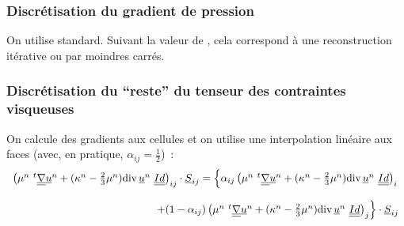 \subsubsection*{Discrétisation du gradient de pression}

On utilise  standard. Suivant la valeur de ,
cela correspond à une reconstruction itérative ou par moindres carrés.

\subsubsection*{Discrétisation du ``reste'' du tenseur des contraintes visqueuses}

On calcule des gradients aux cellules et on utilise une
interpolation linéaire aux
faces (avec, en pratique, $\alpha_{ij}=\frac{1}{2}$)~:
\begin{equation}
\begin{array}{r}
\left(\mu^n\ ^t\gradt{\vect{u}^n} + (\kappa^n-\frac{2}{3}\mu^n)
\divs{\vect{u}^n}\ \tens{Id}\right)_{ij}\cdot\vect{S}_{ij}
= \left\{\alpha_{ij} \left(\mu^n\ ^t\gradt{\vect{u}^n}
+ (\kappa^n-\frac{2}{3}\mu^n)\divs{\vect{u}^n}\ \tens{Id}\right)_i\right.\\
\\
\left.+ (1-\alpha_{ij}) \left(\mu^n\ ^t\gradt{\vect{u}^n}
+ (\kappa^n-\frac{2}{3}\mu^n)\divs{\vect{u}^n}\ \tens{Id}\right)_j
\right\} \cdot\vect{S}_{ij}\\
\end{array}
\end{equation}

